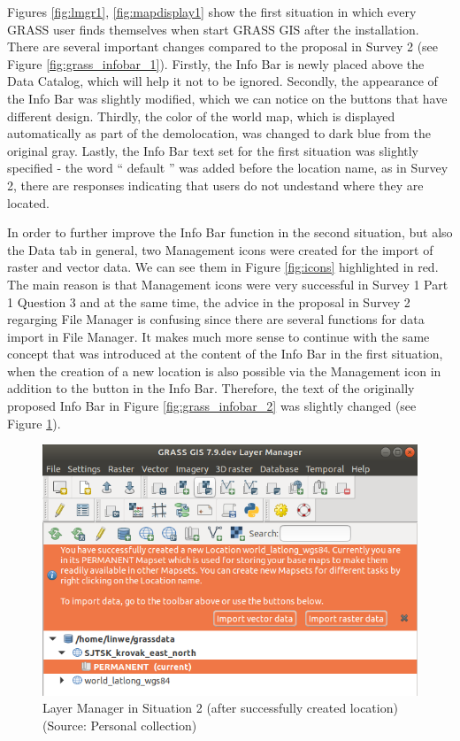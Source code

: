 \documentclass[a4paper,10pt,twoside]{article}
\begin{document}
\noindent Figures \ref{fig:lmgr1}, \ref{fig:mapdisplay1} show the first situation in which every GRASS user finds themselves when start GRASS GIS after the installation. There are several important changes compared to the proposal in Survey 2 (see Figure \ref{fig:grass_infobar_1}). Firstly, the Info Bar is newly placed above the Data Catalog, which will help it not to be ignored. Secondly, the appearance of the Info Bar was slightly modified, which we can notice on the buttons that have different design. Thirdly, the color of the world map, which is displayed automatically as part of the demolocation, was changed to dark blue from the original gray. Lastly, the Info Bar text set for the first situation was slightly specified - the word `` default '' was added before the location name, as in Survey 2, there are responses indicating that users do not undestand where they are located. 

In order to further improve the Info Bar function in the second situation, but also the Data tab in general, two Management icons were created for the import of raster and vector data. We can see them in Figure \ref{fig:icons} highlighted in red. The main reason is that Management icons were very successful in Survey 1 Part 1 Question 3 and at the same time, the advice in the proposal in Survey 2 regarging File Manager is confusing since there are several functions for data import in File Manager. It makes much more sense to continue with the same concept that was introduced at the content of the Info Bar in the first situation, when the creation of a new location is also possible via the Management icon in addition to the button in the Info Bar. 
Therefore, the text of the originally proposed Info Bar in Figure \ref{fig:grass_infobar_2} was slightly changed (see Figure \ref{fig:lmgr2}). 

\begin{figure}[hbt!] 
\begin{center}
\includegraphics[width=13cm]{../pictures/lmgr2.png} 
\caption[Layer Manager in Situation 2  (after successfully created location)]{Layer Manager in Situation 2 (after successfully created location) (Source: Personal collection)}
\label{fig:lmgr2}
\end{center}
\end{figure}
\end{document}
